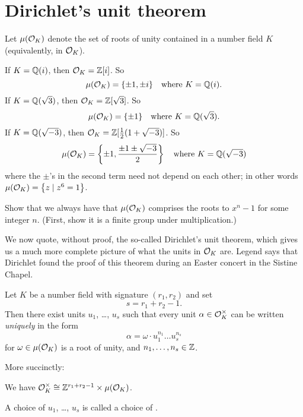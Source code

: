 \section{Dirichlet's unit theorem}

\begin{definition}
	Let $\mu(\OO_K)$ denote the set of roots of unity
	contained in a number field $K$ (equivalently, in $\mathcal O_K$).
\end{definition}
\begin{example}[Examples of $\mu(\OO_K)$]
	\listhack
	\begin{enumerate}[(a)]
		\ii If $K = \mathbb Q(i)$, then $\mathcal O_K = \mathbb Z[i]$. So
		\[ \mu(\mathcal O_K) = \{\pm1, \pm i\} \quad\text{where } K = \mathbb Q(i). \]
		\ii If $K = \mathbb Q(\sqrt3)$, then $\mathcal O_K = \mathbb Z[\sqrt 3]$. So
		\[ \mu(\mathcal O_K) = \{\pm 1\} \quad\text{where } K = \mathbb Q(\sqrt 3). \]
		\ii If $K = \mathbb Q(\sqrt{-3})$, then $\mathcal O_K = \mathbb Z[\frac{1}{2}(1+\sqrt{-3})]$.
		So
		\[ \mu(\mathcal O_K)
			= \left\{ \pm 1, \frac{\pm 1 \pm \sqrt{-3}}{2} \right\}
			\quad\text{where } K = \mathbb Q(\sqrt{-3})
		\]
		where the $\pm$'s in the second term need not depend on each other;
		in other words $\mu(\mathcal O_K) = \left\{ z \mid z^6=1 \right\}$.
	\end{enumerate}
\end{example}
\begin{exercise}
	Show that we always have that $\mu(\OO_K)$
	comprises the roots to $x^n-1$ for some integer $n$.
	(First, show it is a finite group under multiplication.)
\end{exercise}

We now quote, without proof, the so-called Dirichlet's unit theorem,
which gives us a much more complete picture of what the units in $\mathcal O_K$ are.
Legend says that Dirichlet found the proof of this theorem
during an Easter concert in the Sistine Chapel.
\begin{theorem}
	Let $K$ be a number field with signature $(r_1, r_2)$ and set
	\[ s = r_1 + r_2 - 1. \]
	Then there exist units $u_1$, \dots, $u_s$ such that every unit
	$\alpha \in \mathcal O_K^\times$ can be written \emph{uniquely} in the form
	\[ \alpha = \omega \cdot u_1^{n_1} \dots u_s^{n_s} \]
	for $\omega \in \mu(\mathcal O_K)$ is a root of unity,
	and $n_1, \dots, n_s \in \mathbb Z$.
\end{theorem}
More succinctly:
\begin{moral}
We have $\mathcal O_K^\times \cong \mathbb Z^{r_1+r_2-1} \times \mu(\mathcal O_K)$.
\end{moral}
A choice of $u_1$, \dots, $u_s$ is called a choice of .


